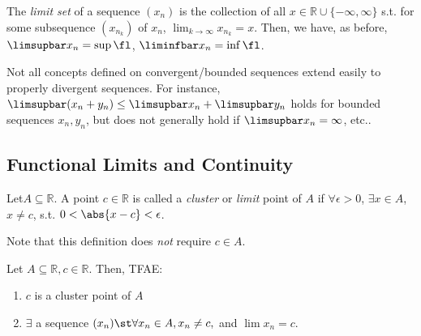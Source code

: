\documentclass[12pt]{article}
\begin{document}

\begin{definition}
  The \textit{limit set} of a sequence $(x_n)$ is the collection of all $x \in \mathbb{R} \cup \{- \infty, \infty\}$ s.t. for some subsequence $(x_{n_k})$ of $x_n$, $\lim_{k\to\infty} x_{n_k} = x$. Then, we have, as before, $\limsupbar x_n = \sup \fl$, $\liminfbar x_n = \inf \fl$.
\end{definition}

\begin{remark}
  Not all concepts defined on convergent/bounded sequences extend easily to properly divergent sequences. For instance, $\limsupbar (x_n + y_n) \leq \limsupbar x_n + \limsupbar y_n$ holds for bounded sequences $x_n, y_n$, but does not generally hold if $\limsupbar x_n = \infty$, etc..
\end{remark}

\subsection{Functional Limits and Continuity}

\begin{definition}
  Let\footnotemark $A \subseteq \mathbb{R}$. A point $c \in \mathbb{R}$ is called a \emph{cluster} or \emph{limit} point of $A$ if $\forall \epsilon > 0$, $\exists x \in A$, $x \neq c$, s.t. $0 < \abs{x-c} < \epsilon$.
\end{definition}

\begin{remark}
  Note that this definition does \emph{not} require $c \in A$.
\end{remark}

\begin{proposition}
  Let $A \subseteq \mathbb{R}, c \in \mathbb{R}$. Then, TFAE:
  \begin{enumerate}
    \item $c$ is a cluster point of $A$
    \item $\exists$ a sequence $(x_n) \st \forall x_n \in A, x_n \neq c,$ and $\lim x_{n} = c$.
  \end{enumerate}
\end{proposition}
\end{document}
